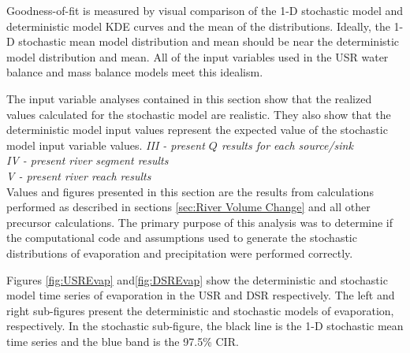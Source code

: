 \begin{linenumbers}
Goodness-of-fit is measured by visual comparison of the 1-D stochastic model and deterministic model KDE curves and the mean of the distributions.  Ideally, the 1-D stochastic mean model distribution and mean should be near the deterministic model distribution and mean.  All of the input variables used in the USR water balance and mass balance models meet this idealism.

The input variable analyses contained in this section show that the realized values calculated for the stochastic model are realistic.  They also show that the deterministic model input values represent the expected value of the stochastic model input variable values.
\emph{III - present $Q$ results for each source/sink}\\

\emph{IV - present river segment results}\\

\emph{V - present river reach results}\\

Values and figures presented in this section are the results from calculations performed as described in sections \ref{sec:River Volume Change} and all other precursor calculations.  The primary purpose of this analysis was to determine if the computational code and assumptions used to generate the stochastic distributions of evaporation and precipitation were performed correctly.  

Figures \ref{fig:USREvap} and\ref{fig:DSREvap} show the deterministic and stochastic model time series of evaporation in the USR and DSR respectively.  The left and right sub-figures present the deterministic and stochastic models of evaporation, respectively.  In the stochastic sub-figure, the black line is the 1-D stochastic mean time series and the blue band is the 97.5\% CIR.


\end{linenumbers}
